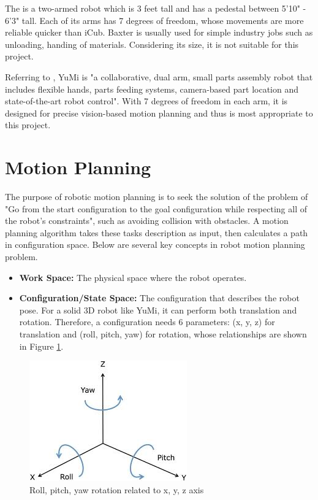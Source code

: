 The \citep{baxter} is a two-armed robot which is 3 feet tall and has a pedestal between 5'10" - 6'3" tall. Each of its arms has 7 degrees of freedom, whose movements are more reliable quicker than iCub. Baxter is usually used for simple industry jobs such as unloading, handing of materials. Considering its size, it is not suitable for this project. 

Referring to \citep{ABBsDual5:online}, YuMi is "a collaborative, dual arm, small parts assembly robot that includes flexible hands, parts feeding systems, camera-based part location and state-of-the-art robot control". With 7 degrees of freedom in each arm, it is designed for precise vision-based motion planning and thus is most appropriate to this project.

\section{Motion Planning}
The purpose of robotic motion planning is to seek the solution of the problem of "Go from the start configuration to the goal configuration while respecting all of the robot's constraints", such as avoiding collision with obstacles. A motion planning algorithm takes these tasks description as input, then calculates a path in configuration space. Below are several key concepts in robot motion planning problem.

\begin{itemize}
    \item \textbf{Work Space:} The physical space where the robot operates.
    \item \textbf{Configuration/State Space:} The configuration that describes the robot pose. For a solid 3D robot like YuMi, it can perform both translation and rotation. Therefore, a configuration needs 6 parameters: (x, y, z) for translation and (roll, pitch, yaw) for rotation, whose relationships are shown in Figure \ref{rpy}.
\end{itemize}

\begin{figure}[H]
\centering
\includegraphics[width = 0.5\columnwidth]{background/rpy.jpg}
\caption{Roll, pitch, yaw rotation related to x, y, z axis}
\label{rpy}
\end{figure}

